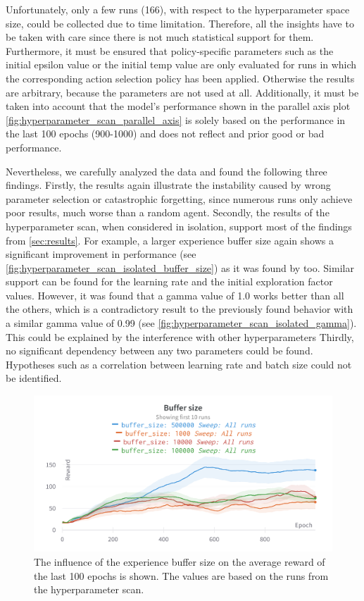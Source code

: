 \documentclass{article}
\begin{document}
Unfortunately, only a few runs (166), with respect to the hyperparameter space size, could be collected due to time limitation.
Therefore, all the insights have to be taken with care since there is not much statistical support for them.
Furthermore, it must be ensured that policy-specific parameters such as the initial epsilon value or the initial temp value are only evaluated for runs in which the corresponding action selection policy has been applied. 
Otherwise the results are arbitrary, because the parameters are not used at all.
Additionally, it must be taken into account that the model's performance shown in the parallel axis plot 
\autoref{fig:hyperparameter_scan_parallel_axis} is solely based on the performance in the last 100 epochs (900-1000) 
and does not reflect and prior good or bad performance.

Nevertheless, we carefully analyzed the data and found the following three findings.
Firstly, the results again illustrate the instability caused by wrong parameter selection or catastrophic forgetting, 
since numerous runs only achieve poor results, much worse than a random agent. 
Secondly, the results of the hyperparameter scan, when considered in isolation, 
support most of the findings from \autoref{sec:results}. 
For example, a larger experience buffer size again shows a significant improvement in performance (see \autoref{fig:hyperparameter_scan_isolated_buffer_size})
as it was found by \cite{DBLP:conf/icml/FedusRABLRD20} too. 
Similar support can be found for the learning rate and the initial exploration factor values.
However, it was found that a gamma value of 1.0 works better than all the others, 
which is a contradictory result to the previously found behavior with a similar gamma value of 0.99 (see \autoref{fig:hyperparameter_scan_isolated_gamma}).
This could be explained by the interference with other hyperparameters
Thirdly, no significant dependency between any two parameters could be found.
Hypotheses such as a correlation between learning rate and batch size could not be identified. 

\begin{figure}[ht!]
   \centering
   \includegraphics[width=\columnwidth]{assets/hyperparamter-scan/W&B Chart Buffer size.png}
   \caption{The influence of the experience buffer size on the average reward of the last 100 epochs is shown. The values are based on the runs from the hyperparameter scan.
   }
   \label{fig:hyperparameter_scan_isolated_buffer_size}
\end{figure}
\end{document}
